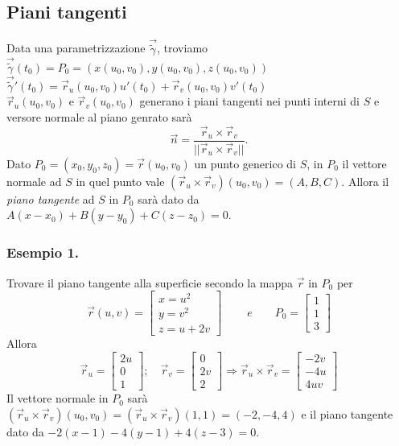 \documentclass[10pt]{article}
\theoremstyle{plain}
\theoremstyle{definition}
\begin{document}
\subsection{Piani tangenti}
Data una parametrizzazione $\vec{\widetilde{\gamma}}$, troviamo $\vec{\widetilde{\gamma}}(t_0)=P_0=(x(u_0,v_0),y(u_0,v_0),z(u_0,v_0))$
\\
$\vec{\widetilde{\gamma}}'(t_0)=\vec{r}_u(u_0,v_0)u'(t_0)+\vec{r}_v(u_0,v_0)v'(t_0)$ 
\\ $\vec{r}_u(u_0,v_0)$ e $\vec{r}_v(u_0,v_0)$ generano i piani tangenti nei punti interni di $S$ e versore normale al piano genrato sarà
$$\vec{n}=\frac{\vec{r}_u \times \vec{r}_v}{||\vec{r}_u \times \vec{r}_v||}.
$$
Dato $P_0=(x_0, y_0, z_0)= \vec{r}(u_0,v_0)$ un punto generico di $S$, in $P_0$ il vettore normale ad $S$ in quel punto vale $(\vec{r}_u \times \vec{r}_v)(u_0, v_0)=(A,B,C).$ Allora il \textit{ piano tangente} ad $S$ in $P_0$ sarà dato da $A(x-x_0)+B(y-y_0)+C(z-z_0)=0$.
\subsubsection{Esempio 1.}
Trovare il piano tangente alla superficie secondo la mappa $\vec{r}$ in $P_0$ per
$$ \vec{r}(u,v)=\begin{bmatrix}
x=u^2 \\ y=v^2 \\ z=u+2v
\end{bmatrix}
\qquad \ e \qquad P_0=\begin{bmatrix}
1 \\ 1 \\ 3
\end{bmatrix}
$$
Allora
$$ \vec{r}_u=\begin{bmatrix}
2u \\ 0 \\ 1
\end{bmatrix}; \quad
\vec{r}_v=\begin{bmatrix}
0 \\ 2v \\ 2 
\end{bmatrix}
\Longrightarrow \vec{r}_u \times \vec{r}_v = \begin{bmatrix}
-2v\\ -4u \\ 4uv
\end{bmatrix}
$$
Il vettore normale in $P_0$ sarà $(\vec{r}_u \times \vec{r}_v)(u_0,v_0)= (\vec{r}_u \times \vec{r}_v)(1,1)=(-2,-4,4) $ e il piano tangente dato da $-2(x-1)-4(y-1)+4(z-3)=0$.
\end{document}
